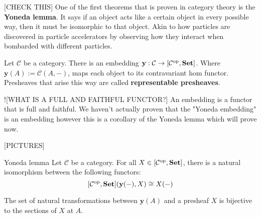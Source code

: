 
[CHECK THIS] One of the first theorems that is proven in category theory is the \textbf{Yoneda lemma}. It says if an object acts like a certain object in every possible way, then it must be isomorphic to that object. Akin to how particles are discovered in particle accelerators by observing how they interact when bombarded with different particles.

\begin{lemma}
    Let $\mathcal{C}$ be a category. There is an embedding $\mathbf{y} : \mathcal{C} \to [\mathcal{C}^{\text{op}}, {\normalfont\textbf{Set}}]$. 
    Where $\mathbf{y}(A) := \mathcal{C}( A, - )$, maps each object to its contravariant hom functor. 
    Presheaves that arise this way are called \textbf{representable presheaves}.
\end{lemma}

\begin{remark}
    ![WHAT IS A FULL AND FAITHFUL FUNCTOR?]
    An embedding is a functor that is full and faithful. We haven't actually proven that the "Yoneda embedding" is an embedding however this is a corollary of the Yoneda lemma which will prove now.
\end{remark}

[PICTURES]

\begin{theorem}{Yoneda lemma}
    Let $\mathcal{C}$ be a category. For all $X \in [\mathcal{C}^{\text{op}}, {\normalfont\textbf{Set}}]$, there is a natural isomorphism between the following functors:
        $$[\mathcal{C}^{\text{op}}, {\normalfont\textbf{Set}}](\mathbf{y}(-), X) \cong X(-)$$
\end{theorem}

\begin{remark}
    The set of natural transformations between $\mathbf{y}(A)$ and a presheaf $X$ is bijective to the sections of $X$ at $A$.
\end{remark}





